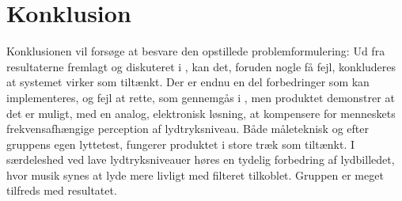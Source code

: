 \chapter{Konklusion}
\label{Konklusion}
Konklusionen vil forsøge at besvare den opstillede problemformulering: \problemformulering
%
\noindent
Ud fra resultaterne fremlagt og diskuteret i , kan det, foruden nogle få fejl, konkluderes at systemet virker som tiltænkt. Der er endnu en del forbedringer som kan implementeres, og fejl at rette, som gennemgås i , men produktet demonstrer at det er muligt, med en analog, elektronisk løsning, at kompensere for menneskets frekvensafhængige perception af lydtryksniveau. Både måleteknisk og efter gruppens egen lyttetest, fungerer produktet i store træk som tiltænkt. I særdeleshed ved lave lydtryksniveauer høres en tydelig forbedring af lydbilledet, hvor musik synes at lyde mere livligt med filteret tilkoblet. Gruppen er meget tilfreds med resultatet.